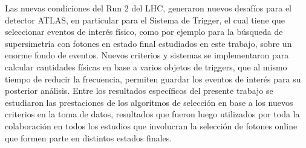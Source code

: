 Las nuevas condiciones del Run 2 del LHC, generaron nuevos desafíos para el detector ATLAS, en particular para el Sistema de Trigger, el cual tiene que seleccionar eventos de interés físico, como por ejemplo para la búsqueda de supersimetría con fotones en estado final estudiados en este trabajo, sobre un enorme fondo de eventos. Nuevos criterios y sistemas se implementaron para calcular cantidades físicas en base a varios objetos de triggers, que al mismo tiempo de reducir la frecuencia, permiten guardar los eventos de interés para su posterior análisis. Entre los resultados específicos del presente trabajo se estudiaron las prestaciones de los algoritmos de selección en base a los nuevos criterios en la toma de datos, resultados que fueron luego utilizados por toda la colaboración en todos los estudios que involucran la selección de fotones online que formen parte en distintos estados finales. 
